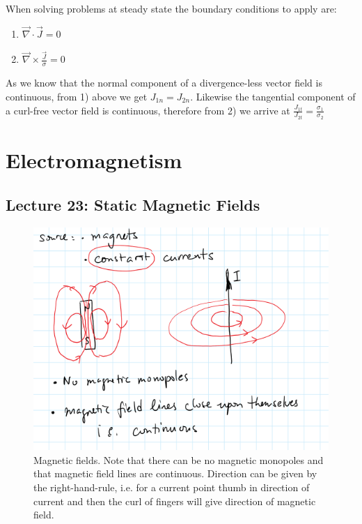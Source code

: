 \documentclass[10pt]{article}
\begin{document}
When solving problems at steady state the boundary conditions to apply are:

\begin{enumerate}
	\item $ \vec{\nabla} \cdot \vec{J} = 0 $ 
	\item $ \vec{\nabla} \times \frac{\vec{J}}{\sigma} = 0 $ 
\end{enumerate}

As we know that the normal component of a divergence-less vector field is continuous, from 1) above we get $ J_{1n} = J_{2n} $.
Likewise the tangential component of a curl-free vector field is continuous, therefore from 2) we arrive at $ \frac{J_{1t}}{J_{2t}} = \frac{\sigma_1}{\sigma_2} $ 

\section{Electromagnetism}


\subsection{Lecture 23: Static Magnetic Fields}


\begin{figure}[H]
	\centering
	\includegraphics[width=0.8\linewidth]{img/259_mag_fields.png}
	\caption{Magnetic fields. Note that there can be no magnetic monopoles and that magnetic field lines are continuous. Direction can be given by the right-hand-rule, i.e. for a current point thumb in direction of current and then the curl of fingers will give direction of magnetic field.}
	\label{fig:259:magnetic_field_init}
\end{figure}
\end{document}
